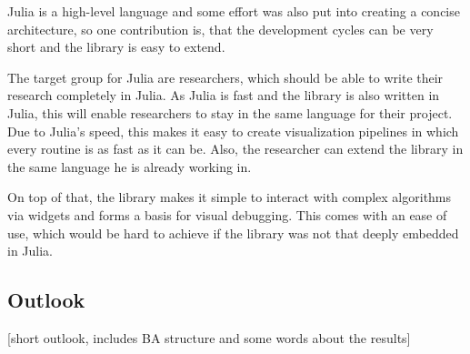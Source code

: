 Julia is a high-level language and some effort was also put into creating a concise architecture, so one contribution is, that the development cycles can be very short and the library is easy to extend.

The target group for Julia are researchers, which should be able to write their research completely in Julia.
As Julia is fast and the library is also written in Julia, this will enable researchers to stay in the same language for their project. Due to Julia's speed, this makes it easy to create visualization pipelines in which every routine is as fast as it can be. Also, the researcher can extend the library in the same language he is already working in.

On top of that, the library makes it simple to interact with complex algorithms via widgets and forms a basis for visual debugging. This comes with an ease of use, which would be hard to achieve if the library was not that deeply embedded in Julia.


\subsection{Outlook}
[short outlook, includes BA structure and some words about the results]